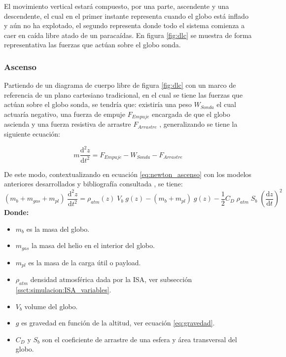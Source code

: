 El movimiento vertical estará compuesto, por una parte, ascendente y una descendente, el cual en el primer instante representa cuando el globo está inflado y aún no ha explotado, el segundo  representa  donde todo el sistema comienza a caer en caída libre atado de un paracaídas. En figura \ref{fig:dlc} se muestra de forma representativa las fuerzas que actúan sobre el globo sonda.

\subsubsection{Ascenso}

Partiendo de un diagrama de cuerpo libre de figura \ref{fig:dlc} con un marco de referencia de un plano cartesiano tradicional,  en el cual se tiene las fuerzas que actúan sobre el globo sonda, se tendría que: existiría una peso $W_{Sonda}$ el cual actuaría negativo, una fuerza de empuje $F_{Empuje}$ encargada de que el globo ascienda y una fuerza resistiva de arrastre $F_{Arrastre}$ , generalizando  se tiene la siguiente ecuación:

\begin{equation}
    \label{eq:newton_ascenso}
  m \frac{\mathrm{d^2} z }{\mathrm{d} t^2}  =  F_{Empuje} - W_{Sonda} - F_{Arrastre}
\end{equation}

De este modo, contextualizando en ecuación \ref{eq:newton_ascenso}  con los modelos anteriores desarrollados y bibliografía consultada \cite{lsoda, ascenso_formula, ascenso_formula_2, constante_CD_y_formula_ascenso, simulador_chino}, se tiene:
\begin{equation}
    \label{eq:ascenso}
     ( m_{b} + m_{gas} + m_{pl} ) \; \frac{\mathrm{d^2} z }{\mathrm{d} t^2}  =  \rho_{atm} (z) \; V_{b} \; g (z) -( m_{b} + m_{pl} ) \; g(z) - \frac{1}{2} C_{D} \; \rho_{atm} \; S_{b} \; \left ( \frac{\mathrm{d} z }{\mathrm{d} t} \right )^{2}
\end{equation}
\textbf{Donde:}
\begin{itemize}
    \item $m_{b}$ es la masa del globo.
    \item $m_{gas}$ la masa del helio en el interior del globo.
    \item $m_{pl}$ es la masa de la carga útil o payload.
    \item $\rho_{atm}$ densidad atmosférica dada por la ISA, ver subsección \ref{ssct:simulacion:ISA_variables}.
    \item  $V_{b}$ volume del globo.
    \item $g$ es gravedad en función de la altitud, ver ecuación \ref{eq:gravedad}.
    \item $C_{D}$ y $S_{b}$  son el coeficiente de arrastre de una esfera y área transversal del globo.
\end{itemize}

